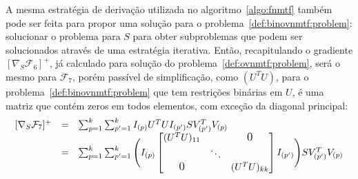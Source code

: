\documentclass[
    12pt,                %
    oneside,            %
    a4paper,            %
    english,            %
    brazil                %
    ]{abntex2ppgsi}
\begin{document}
A mesma estratégia de derivação utilizada no algoritmo~\ref{algo:fnmtf} também pode ser feita para propor uma solução para o problema~\ref{def:binovnmtf:problem}: solucionar o problema para $S$ para obter subproblemas que podem ser solucionados através de uma estratégia iterativa.
Então, recapitulando o gradiente $[\nabla_S \mathcal{F}_6]^+$, já calculado para solução do problema~\ref{def:ovnmtf:problem}, será o mesmo para $\mathcal{F}_7$, porém passível de simplificação, como $(U^T U)$, para o problema~\ref{def:binovnmtf:problem} que tem restrições binárias em $U$, é uma matriz que contém zeros em todos elementos, com exceção da diagonal principal:
\[
    \begin{array}{lcl}
        [\nabla_S \mathcal{F}_7]^+ & = & \sum_{p=1}^{k} \sum_{p'=1}^{k} I_{(p)} U^T U I_{(p')} S V_{(p')}^T V_{(p)} \\
                                   & = & \sum_{p=1}^{k} \sum_{p'=1}^{k} \Bigg( I_{(p)}
                                   \begin{bmatrix}
                                       (U^T U)_{11}            &        & \smash{\text{\large 0}} \\
                                                               & \ddots &                         \\
                                       \smash{\text{\large 0}} &        & (U^T U)_{kk}
                                   \end{bmatrix} I_{(p')} \Bigg) S V_{(p')}^T V_{(p)}
    \end{array} \nonumber
\]
\end{document}
